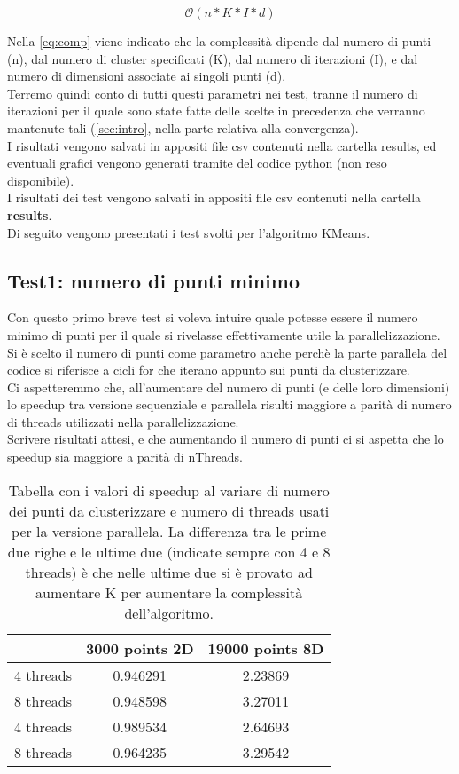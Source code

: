 \documentclass[10pt,twocolumn,letterpaper]{article}
\begin{document}
\begin{equation}
\label{eq:comp}
    \mathcal{O}(n * K * I * d)
\end{equation}

Nella \cref{eq:comp} viene indicato che la complessità dipende dal numero di punti (n), dal numero di cluster specificati (K), dal numero di iterazioni (I), e dal numero di dimensioni associate ai singoli punti (d).\\
Terremo quindi conto di tutti questi parametri nei test, tranne il numero di iterazioni per il quale sono state fatte delle scelte in precedenza che verranno mantenute tali (\cref{sec:intro}, nella parte relativa alla convergenza).\\
I risultati vengono salvati in appositi file csv contenuti nella cartella results, ed eventuali grafici vengono generati tramite del codice python (non reso disponibile).\\
I risultati dei test vengono salvati in appositi file csv contenuti nella cartella \textbf{results}.\\
Di seguito vengono presentati i test svolti per l'algoritmo KMeans.

\subsection{Test1: numero di punti minimo}
\label{sec:t1}
Con questo primo breve test si voleva intuire quale potesse essere il numero minimo di punti per il quale si rivelasse effettivamente utile la parallelizzazione. Si è scelto il numero di punti come parametro anche perchè la parte parallela del codice si riferisce a cicli for che iterano appunto sui punti da clusterizzare.\\
Ci aspetteremmo che, all'aumentare del numero di punti (e delle loro dimensioni) lo speedup tra versione sequenziale e parallela risulti maggiore a parità di numero di threads utilizzati nella parallelizzazione.\\
Scrivere risultati attesi, e che aumentando il numero di punti ci si aspetta che lo speedup sia maggiore a parità di nThreads.

\begin{table}[h]
\centering
\begin{tabular}{ |c|c|c| } 
\hline
 & 3000 points 2D & 19000 points 8D \\
\hline
4 threads & 0.946291 & 2.23869\\
\hline
8 threads & 0.948598 & 3.27011\\
\hline
4 threads & 0.989534 & 2.64693\\
\hline
8 threads & 0.964235 & 3.29542\\
\hline
\end{tabular}
\vspace*{3mm}
\caption{Tabella con i valori di speedup al variare di numero dei punti da clusterizzare e numero di threads usati per la versione parallela. La differenza tra le prime due righe e le ultime due (indicate sempre con 4 e 8 threads) è che nelle ultime due si è provato ad aumentare K per aumentare la complessità dell'algoritmo.}
\label{table:t1}
\end{table}
\end{document}
